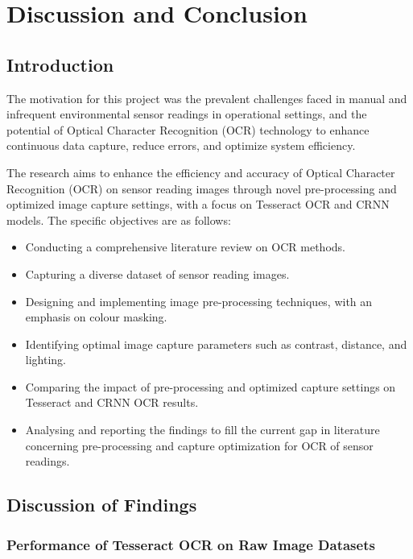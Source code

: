 \chapter{Discussion and Conclusion}
\label{chap:conclusion}

\section{Introduction}

The motivation for this project was the prevalent challenges faced in manual and infrequent environmental sensor readings in operational settings, and the potential of Optical Character Recognition (OCR) technology to enhance continuous data capture, reduce errors, and optimize system efficiency.


The research aims to enhance the efficiency and accuracy of Optical Character Recognition (OCR) on sensor reading images through novel pre-processing and optimized image capture settings, with a focus on Tesseract OCR and CRNN models. The specific objectives are as follows:

\begin{itemize}
    \item Conducting a comprehensive literature review on OCR methods.
    \item Capturing a diverse dataset of sensor reading images.
    \item Designing and implementing image pre-processing techniques, with an emphasis on colour masking.
    \item Identifying optimal image capture parameters such as contrast, distance, and lighting.
    \item Comparing the impact of pre-processing and optimized capture settings on Tesseract and CRNN OCR results.
    \item Analysing and reporting the findings to fill the current gap in literature concerning pre-processing and capture optimization for OCR of sensor readings.
\end{itemize}




\section{Discussion of Findings}


\subsection{Performance of Tesseract OCR on Raw Image Datasets}

